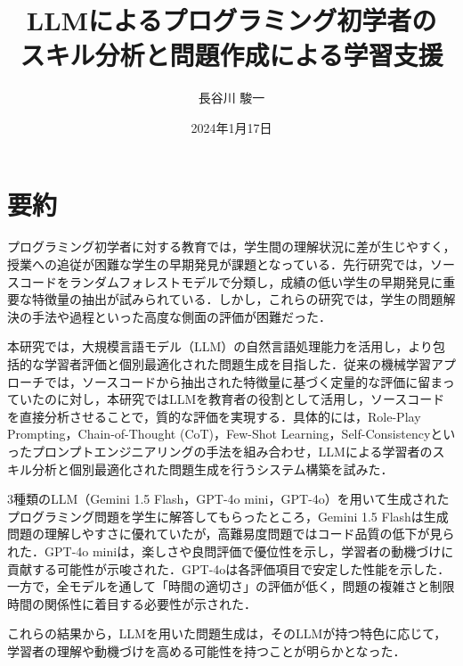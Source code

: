 \documentclass[11pt]{jreport}
\begin{document}
\title{LLMによるプログラミング初学者の\\スキル分析と問題作成による学習支援}
\author{長谷川 駿一}
\date{2024年1月17日}

\maketitle

\chapter*{要約}
プログラミング初学者に対する教育では，学生間の理解状況に差が生じやすく，授業への追従が困難な学生の早期発見が課題となっている．先行研究では，ソースコードをランダムフォレストモデルで分類し，成績の低い学生の早期発見に重要な特徴量の抽出が試みられている．しかし，これらの研究では，学生の問題解決の手法や過程といった高度な側面の評価が困難だった．

本研究では，大規模言語モデル（LLM）の自然言語処理能力を活用し，より包括的な学習者評価と個別最適化された問題生成を目指した．従来の機械学習アプローチでは，ソースコードから抽出された特徴量に基づく定量的な評価に留まっていたのに対し，本研究ではLLMを教育者の役割として活用し，ソースコードを直接分析させることで，質的な評価を実現する．具体的には，Role-Play Prompting，Chain-of-Thought (CoT)，Few-Shot Learning，Self-Consistencyといったプロンプトエンジニアリングの手法を組み合わせ，LLMによる学習者のスキル分析と個別最適化された問題生成を行うシステム構築を試みた．

3種類のLLM（Gemini 1.5 Flash，GPT-4o mini，GPT-4o）を用いて生成されたプログラミング問題を学生に解答してもらったところ，Gemini 1.5 Flashは生成問題の理解しやすさに優れていたが，高難易度問題ではコード品質の低下が見られた．GPT-4o miniは，楽しさや良問評価で優位性を示し，学習者の動機づけに貢献する可能性が示唆された．GPT-4oは各評価項目で安定した性能を示した．一方で，全モデルを通して「時間の適切さ」の評価が低く，問題の複雑さと制限時間の関係性に着目する必要性が示された．

これらの結果から，LLMを用いた問題生成は，そのLLMが持つ特色に応じて，学習者の理解や動機づけを高める可能性を持つことが明らかとなった．

\newpage
\setcounter{page}{0}
\tableofcontents

\newpage
\setcounter{page}{1}

\end{document}
